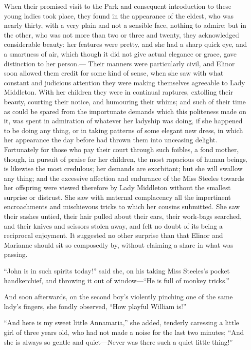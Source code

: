 When their promised visit to the Park and consequent
introduction to these young ladies took place, they found
in the appearance of the eldest, who was nearly thirty,
with a very plain and not a sensible face, nothing to admire;
but in the other, who was not more than two or three
and twenty, they acknowledged considerable beauty; her
features were pretty, and she had a sharp quick eye,
and a smartness of air, which though it did not give
actual elegance or grace, gave distinction to her person.---%
Their manners were particularly civil, and Elinor soon
allowed them credit for some kind of sense, when she
saw with what constant and judicious attention they
were making themselves agreeable to Lady Middleton.
With her children they were in continual raptures,
extolling their beauty, courting their notice, and humouring
their whims; and such of their time as could be spared from
the importunate demands which this politeness made on it,
was spent in admiration of whatever her ladyship was doing,
if she happened to be doing any thing, or in taking patterns
of some elegant new dress, in which her appearance
the day before had thrown them into unceasing delight.
Fortunately for those who pay their court through
such foibles, a fond mother, though, in pursuit of praise
for her children, the most rapacious of human beings,
is likewise the most credulous; her demands are exorbitant;
but she will swallow any thing; and the excessive
affection and endurance of the Miss Steeles towards
her offspring were viewed therefore by Lady Middleton
without the smallest surprise or distrust.  She saw with
maternal complacency all the impertinent encroachments
and mischievous tricks to which her cousins submitted.
She saw their sashes untied, their hair pulled about
their ears, their work-bags searched, and their knives
and scissors stolen away, and felt no doubt of its being
a reciprocal enjoyment.  It suggested no other surprise
than that Elinor and Marianne should sit so composedly by,
without claiming a share in what was passing.

``John is in such spirits today!'' said she, on his
taking Miss Steeles's pocket handkerchief, and throwing
it out of window---``He is full of monkey tricks.''

And soon afterwards, on the second boy's violently
pinching one of the same lady's fingers, she fondly observed,
``How playful William is!''

``And here is my sweet little Annamaria,'' she added,
tenderly caressing a little girl of three years old,
who had not made a noise for the last two minutes;
``And she is always so gentle and quiet---Never was there
such a quiet little thing!''

